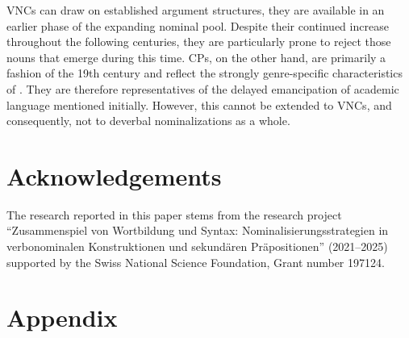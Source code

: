 \documentclass[output=paper,colorlinks,citecolor=brown]{langscibook}
\begin{document}
VNCs can draw on established argument structures, they are available in an earlier phase of the expanding nominal pool. Despite their continued increase throughout the following centuries, they are particularly prone to reject those nouns that emerge during this time. CPs, on the other hand, are primarily a fashion of the 19th century and reflect the strongly genre-specific characteristics of . They are therefore representatives of the delayed emancipation of  academic language mentioned initially. However, this cannot be extended to VNCs, and consequently, not to deverbal nominalizations as a whole.


\section*{Acknowledgements}

The research reported in this paper stems from the research project “Zusammenspiel von Wortbildung und Syntax: Nominalisierungsstrategien in verbonominalen Konstruktionen und sekundären Präpositionen” (2021–2025) supported by the Swiss National Science Foundation, Grant number 197124. 


{\sloppy\printbibliography[heading=subbibliography,notkeyword=this]}
\newpage
\section*{Appendix}
\end{document}
